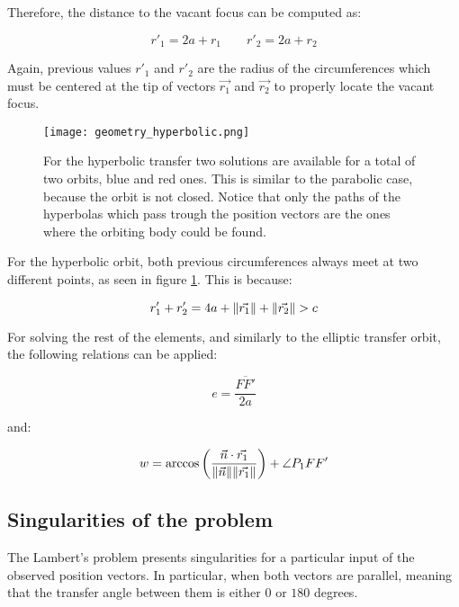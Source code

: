 Therefore, the distance to the vacant focus can be computed as:

\begin{equation}
  r'_{1} = 2a + r_{1}\quad\quad
  r'_{2} = 2a + r_{2}
\end{equation}

Again, previous values $r'_{1}$ and $r'_{2}$ are the radius of the
circumferences which must be centered at the tip of vectors $\vec{r_{1}}$ and
$\vec{r_{2}}$ to properly locate the vacant focus.


\vspace{0.15cm}
\begin{figure}[H]
  \centering
  \texttt{[image: geometry\_hyperbolic.png]}
  \caption[Hyperbolic transfer geometry]{For the hyperbolic transfer two solutions are available for a total
    of two orbits, blue and red ones. This is similar to the parabolic case, because the
    orbit is not closed. Notice that only the paths of the hyperbolas which pass trough the
    position vectors are the ones where the orbiting body could be found.
  }
  \label{fig:hyperbolic_geometry}
\end{figure}

For the hyperbolic orbit, both previous circumferences always meet at two
different points, as seen in figure \ref{fig:hyperbolic_geometry}. This is
because:

\begin{equation}
  r'_{1} + r'_{2} = 4a + \lVert\vec{r_{1}}\rVert + \lVert\vec{r_{2}}\rVert > c
\end{equation}

For solving the rest of the elements, and similarly to the elliptic transfer
orbit, the following relations can be applied:

\begin{equation}
  e = \frac{\overline{FF'}}{2a}
  \label{eq:ellipse_ecc}
\end{equation}

and:

\begin{equation}
  w = \arccos{\left(\frac{\vec{n} \cdot \vec{r_{1}}}{\lVert\vec{n}\rVert
      \lVert\vec{r_{1}}\rVert} \right) + \angle P_{1}FF'}
  \label{eq:hyperbola_w}
\end{equation}


\subsection{Singularities of the problem}
The Lambert's problem presents singularities for a particular input of the
observed position vectors. In particular, when both vectors are parallel,
meaning that the transfer angle between them is either $0$ or $180$ degrees.

